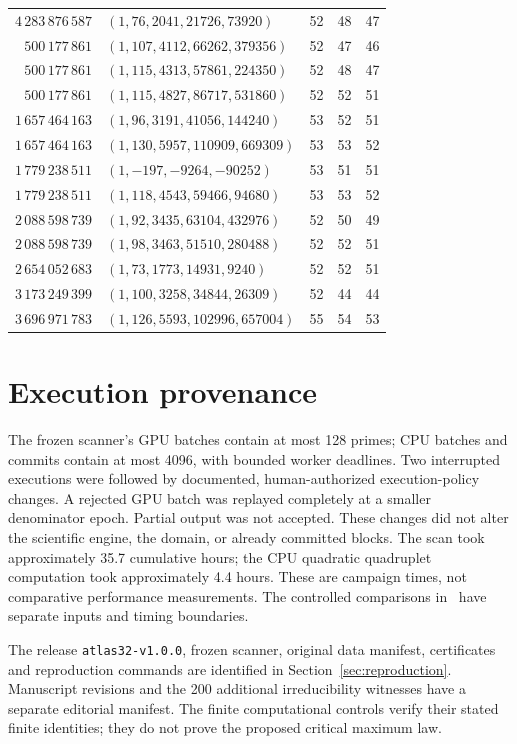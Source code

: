 \documentclass[11pt]{article}
\theoremstyle{definition}\newtheorem{definition}[theorem]{Definition}
\begin{document}
\begin{center}
\begin{longtable}{rP{85mm}rrr}
$4\,283\,876\,587$ & $(1,76,2041,21726,73920)$ & 52 & 48 & 47 \\
$500\,177\,861$ & $(1,107,4112,66262,379356)$ & 52 & 47 & 46 \\
$500\,177\,861$ & $(1,115,4313,57861,224350)$ & 52 & 48 & 47 \\
$500\,177\,861$ & $(1,115,4827,86717,531860)$ & 52 & 52 & 51 \\
$1\,657\,464\,163$ & $(1,96,3191,41056,144240)$ & 53 & 52 & 51 \\
$1\,657\,464\,163$ & $(1,130,5957,110909,669309)$ & 53 & 53 & 52 \\
$1\,779\,238\,511$ & $(1,-197,-9264,-90252)$ & 53 & 51 & 51 \\
$1\,779\,238\,511$ & $(1,118,4543,59466,94680)$ & 53 & 53 & 52 \\
$2\,088\,598\,739$ & $(1,92,3435,63104,432976)$ & 52 & 50 & 49 \\
$2\,088\,598\,739$ & $(1,98,3463,51510,280488)$ & 52 & 52 & 51 \\
$2\,654\,052\,683$ & $(1,73,1773,14931,9240)$ & 52 & 52 & 51 \\
$3\,173\,249\,399$ & $(1,100,3258,34844,26309)$ & 52 & 44 & 44 \\
$3\,696\,971\,783$ & $(1,126,5593,102996,657004)$ & 55 & 54 & 53 \\
\bottomrule\end{longtable}\end{center}


\section{Execution provenance}\label{app:execution}
The frozen scanner's GPU batches contain at most 128 primes;
CPU batches and commits contain at most 4096, with bounded worker
deadlines. Two interrupted executions were followed by documented,
human-authorized execution-policy changes. A rejected GPU batch
was replayed completely at a smaller denominator epoch. Partial
output was not accepted. These changes did not alter the scientific
engine, the domain, or already committed blocks.
The scan took approximately 35.7 cumulative hours; the CPU quadratic
quadruplet computation took approximately 4.4 hours. These are
campaign times, not comparative performance measurements. The controlled
comparisons in~\cite[Section~7]{gpumethod} have separate inputs and timing
boundaries.

The release \texttt{atlas32-v1.0.0}, frozen scanner, original data
manifest, certificates and reproduction commands are identified in
Section~\ref{sec:reproduction}. Manuscript revisions and the 200
additional irreducibility witnesses have a separate editorial manifest.
The finite computational controls verify their stated finite identities;
they do not prove the proposed critical maximum law.
\end{document}
